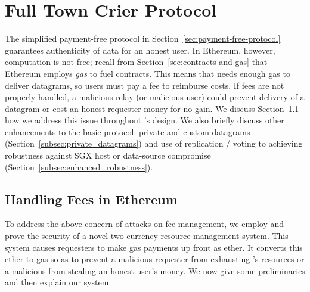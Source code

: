 \section{Full Town Crier Protocol}
\label{sec:enhanced_protocol}

The simplified payment-free protocol in Section~\ref{sec:payment-free-protocol} guarantees authenticity of data for an honest user.
In Ethereum, however, computation is not free; recall from Section~\ref{sec:contracts-and-gas} that Ethereum employs \emph{gas} to fuel contracts. This means that \tc needs enough gas to deliver datagrams, so users must pay a fee to reimburse costs. If fees are not properly handled, a malicious relay (or malicious user) could prevent delivery of a datagram or cost an honest requester money for no gain. We discuss Section~\ref{sec:gas-protocol} how we address this issue throughout \tc's design. We also briefly discuss other enhancements to the basic \tc protocol: private and custom datagrams (Section~\ref{subsec:private_datagrams}) and use of replication / voting to achieving robustness against SGX host or data-source compromise (Section~\ref{subsec:enhanced_robustness}).


\subsection{Handling Fees in Ethereum}
\label{sec:gas-protocol}


To address the above concern of attacks on \tc fee management, we employ and prove the security of a novel two-currency resource-management system. This system causes
requesters to make gas payments up front as ether. It converts this ether to gas so as to prevent a malicious requester from exhausting \tc's resources
or a malicious \tc from stealing an honest user's money. We now give some preliminaries and then explain our system.


